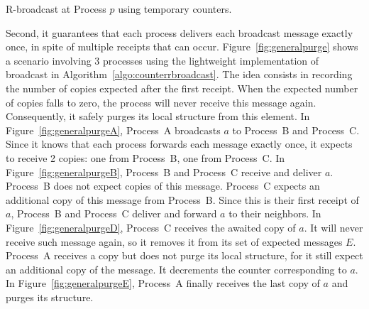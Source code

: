 \begin{algorithm}
  
  \caption{\label{algo:counterrbroadcast}R-broadcast at Process $p$ using
    temporary counters.}
\end{algorithm}


Second, it guarantees that each process delivers each broadcast message exactly
once, in spite of multiple receipts that can occur.
Figure~\ref{fig:generalpurge} shows a scenario involving 3 processes using the
lightweight implementation of broadcast in
Algorithm~\ref{algo:counterrbroadcast}. The idea consists in recording the
number of copies expected after the first receipt. When the expected number of
copies falls to zero, the process will never receive this message
again. Consequently, it safely purges its local structure from this element. In
Figure~\ref{fig:generalpurgeA}, Process~A broadcasts $a$ to Process~B and
Process~C. Since it knows that each process forwards each message exactly once,
it expects to receive 2 copies: one from Process~B, one from Process~C. In
Figure~\ref{fig:generalpurgeB}, Process~B and Process~C receive and deliver
$a$. Process~B does not expect copies of this message. Process~C expects an
additional copy of this message from Process~B.  Since this is their first
receipt of $a$, Process~B and Process~C deliver and forward $a$ to their
neighbors. In Figure~\ref{fig:generalpurgeD}, Process~C receives the awaited
copy of $a$. It will never receive such message again, so it removes it from its
set of expected messages $E$. Process~A receives a copy but does not purge its
local structure, for it still expect an additional copy of the message. It
decrements the counter corresponding to $a$. In Figure~\ref{fig:generalpurgeE},
Process~A finally receives the last copy of $a$ and purges its structure.

